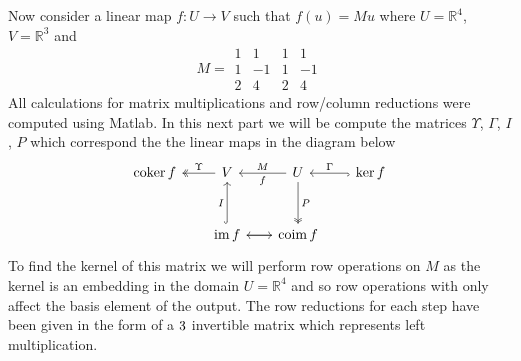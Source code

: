 \documentclass[12pt]{amsart}
\theoremstyle{definition}
\newcommand{\R}{\mathbb{R}}
\DeclareMathOperator{\kernel}{\mathrm{ker}}
\DeclareMathOperator{\coker}{\mathrm{coker}}
\DeclareMathOperator{\image}{\mathrm{im}}
\DeclareMathOperator{\coim}{\mathrm{coim}}
\newcommand{\ra}{\rightarrow}
\begin{document}
\begin{enumerate}[start=0]
    Now consider a linear map $f:U\ra V$ such that $f(u)=Mu$ where  $U=\R^4$, $V=\R^3$ and $$M=
 \boxed{\begin{matrix}
1 & 1 & 1 & 1\\
1 & -1 & 1 & -1 \\
2 & 4 & 2 & 4
\end{matrix}}$$ 
All calculations for matrix multiplications and row/column reductions were computed using Matlab. In this next part we will be compute the matrices $\Upsilon$, $\Gamma$, $I$, $P$ which correspond the the linear maps in the diagram below
\[\begin{tikzcd}[row sep=1cm, column sep=.65cm]
     \coker f &\arrow[l, twoheadrightarrow, "\Upsilon"']V& U\arrow[d, twoheadrightarrow, "P"]\arrow[l, "M"', "f"] & \kernel f\arrow[l, "\Gamma"', hook]\\
     &\image f\arrow[u, hook, "I"]\arrow[r]& \coim f\arrow[l]
    \end{tikzcd}\]
To find the kernel of this matrix we will perform row operations on $M$ as the kernel is an embedding in the domain $U=\R^4$ and so row operations with only affect the basis element of the output. The row reductions for each step have been given in the form of a $3\time 3$ invertible matrix which represents left multiplication. 


\end{enumerate}
\end{document}
